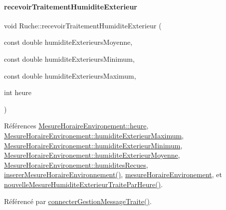 \paragraph{\texorpdfstring{recevoir\+Traitement\+Humidite\+Exterieur}{recevoirTraitementHumiditeExterieur}}
{\footnotesize\ttfamily void Ruche\+::recevoir\+Traitement\+Humidite\+Exterieur (\begin{DoxyParamCaption}\item[{const double}]{humidite\+Exterieurs\+Moyenne,  }\item[{const double}]{humidite\+Exterieurs\+Minimum,  }\item[{const double}]{humidite\+Exterieurs\+Maximum,  }\item[{int}]{heure }\end{DoxyParamCaption})\hspace{0.3cm}{\ttfamily [slot]}}



Références \hyperlink{struct_mesure_horaire_environement_a83295c95940d9edae2d082a94f49e1c9}{Mesure\+Horaire\+Environement\+::heure}, \hyperlink{struct_mesure_horaire_environement_abb2c00c4262837d9e1122573283d86ec}{Mesure\+Horaire\+Environement\+::humidite\+Exterieur\+Maximum}, \hyperlink{struct_mesure_horaire_environement_a1621bd692dc352708d1931a48df9a596}{Mesure\+Horaire\+Environement\+::humidite\+Exterieur\+Minimum}, \hyperlink{struct_mesure_horaire_environement_a25909e0885ee3588c637b738ced303d7}{Mesure\+Horaire\+Environement\+::humidite\+Exterieur\+Moyenne}, \hyperlink{struct_mesure_horaire_environement_a4348771984d70b9ea7867dba511db336}{Mesure\+Horaire\+Environement\+::humidites\+Recues}, \hyperlink{class_ruche_ac52e79446c5629645e02e27d2a01e56c}{inserer\+Mesure\+Horaire\+Environnement()}, \hyperlink{class_ruche_a73a826506110c10d9221065670985e52}{mesure\+Horaire\+Environement}, et \hyperlink{class_ruche_aab1ad40a46ab5fe4352a23e4a986856b}{nouvelle\+Mesure\+Humidite\+Exterieur\+Traite\+Par\+Heure()}.



Référencé par \hyperlink{class_ruche_a20ec8c6dc931218e5cf682050fe845d9}{connecter\+Gestion\+Message\+Traite()}.


